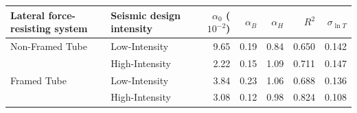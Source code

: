 \begin{tabular}{llrrrrr}
\toprule
Lateral force-resisting system & Seismic design intensity & $\alpha_0$ ($10^{-2}$) & $\alpha_B$ & $\alpha_H$ & $R^2$ & $\sigma_{\ln T}$ \\
\midrule
Non-Framed Tube & Low-Intensity & 9.65 & 0.19 & 0.84 & 0.650 & 0.142 \\
 & High-Intensity & 2.22 & 0.15 & 1.09 & 0.711 & 0.147 \\
Framed Tube & Low-Intensity & 3.84 & 0.23 & 1.06 & 0.688 & 0.136 \\
 & High-Intensity & 3.08 & 0.12 & 0.98 & 0.824 & 0.108 \\
\bottomrule
\end{tabular}
